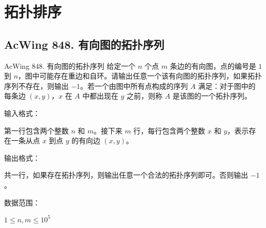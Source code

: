 \section{拓扑排序}

\subsection{AcWing 848. 有向图的拓扑序列}
\begin{titledbox}{AcWing 848. 有向图的拓扑序列}
    给定一个 $n$ 个点 $m$ 条边的有向图，点的编号是 $1$ 到 $n$，图中可能存在重边和自环。请输出任意一个该有向图的拓扑序列，如果拓扑序列不存在，则输出 $-1$。若一个由图中所有点构成的序列 $A$ 满足：对于图中的每条边 $(x, y)$，$x$ 在 $A$ 中都出现在 $y$ 之前，则称 $A$ 是该图的一个拓扑序列。

    输入格式：

    第一行包含两个整数 $n$ 和 $m$。接下来 $m$ 行，每行包含两个整数 $x$ 和 $y$，表示存在一条从点 $x$ 到点 $y$ 的有向边 $(x, y)$。

    输出格式：

    共一行，如果存在拓扑序列，则输出任意一个合法的拓扑序列即可。否则输出 $-1$。

    数据范围：

    $1 \le n,m \le 10^5$

    \begin{inputblock}
         \\
         \\
         \\
         \\
    \end{inputblock}
    \begin{outputblock}
    \end{outputblock}
\end{titledbox}

